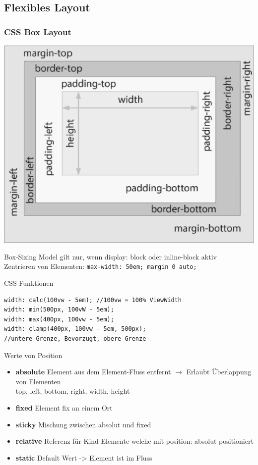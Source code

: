 \subsection{Flexibles Layout}

\subsubsection{CSS Box Layout}
\begin{minipage}{0.7\linewidth}
\begin{center}
    \includegraphics[width=\linewidth]{graphic/responsive/boxmodel.png}
\vspace{-8pt}
\end{center}
\end{minipage}
\begin{minipage}{0.287\linewidth}
    Box-Sizing Model gilt nur, wenn display: block oder inline-block aktiv\\
    Zentrieren von Elementen: \texttt{max-width: 50em; margin 0 auto;}
\end{minipage}
\textcolor{subsectioncolor}{CSS Funktionen}
\begin{lstlisting}
width: calc(100vw - 5em); //100vw = 100% ViewWidth
width: min(500px, 100vW - 5em);
width: max(400px, 100vw - 5em);
width: clamp(400px, 100vw - 5em, 500px);
//untere Grenze, Bevorzugt, obere Grenze
\end{lstlisting}
\textcolor{subsectioncolor}{Werte von Position}
\begin{itemize}
    \item \textbf{absolute} Element aus dem Element-Fluss entfernt $\rightarrow$ Erlaubt Überlappung von Elementen \\
    top, left, bottom, right, width, height
    \item \textbf{fixed} Element fix an einem Ort
    \item \textbf{sticky} Mischung zwischen absolut und fixed
    \item \textbf{relative} Referenz für Kind-Elemente welche mit position: absolut positioniert
    \item \textbf{static} Default Wert -> Element ist im Fluss
\end{itemize}


